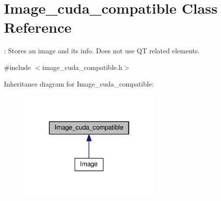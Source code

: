 \hypertarget{classImage__cuda__compatible}{}\section{Image\+\_\+cuda\+\_\+compatible Class Reference}
\label{classImage__cuda__compatible}


\+: Stores an image and it\textquotesingle{}s info. Does not use QT related elements.  




{\ttfamily \#include $<$image\+\_\+cuda\+\_\+compatible.\+h$>$}



Inheritance diagram for Image\+\_\+cuda\+\_\+compatible\+:
\nopagebreak
\begin{figure}[H]
\begin{center}
\leavevmode
\includegraphics[width=202pt]{classImage__cuda__compatible__inherit__graph}
\end{center}
\end{figure}
